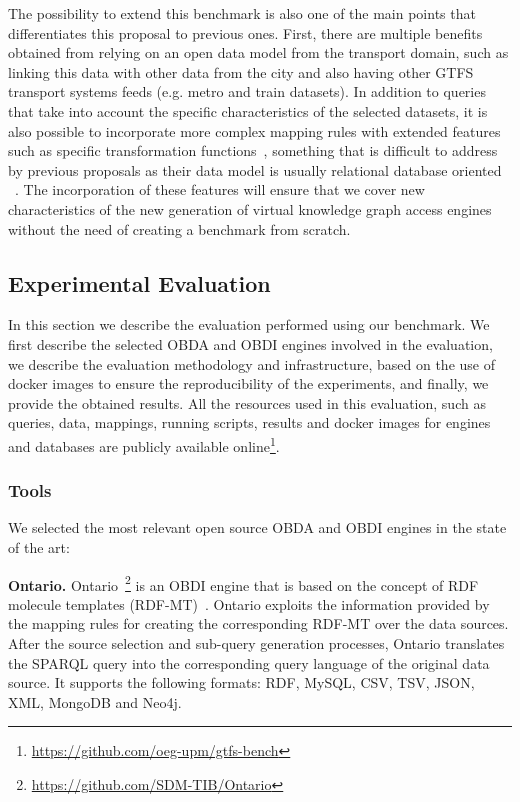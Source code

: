 The possibility to extend this benchmark is also one of the main points that differentiates this proposal to previous ones. First, there are multiple benefits obtained from relying on an open data model from the transport domain, such as linking this data with other data from the city and also having other GTFS transport systems feeds (e.g. metro and train datasets). In addition to queries that take into account the specific characteristics of the selected datasets, it is also possible to incorporate more complex mapping rules with extended features such as specific transformation functions~\citep{de2016ontology}, something that is difficult to address by previous proposals as their data model is usually relational database oriented ~\citep{bizer2009berlin,lanti2015npd}. The incorporation of these features will ensure that we cover new characteristics of the new generation of virtual knowledge graph access engines without the need of creating a benchmark from scratch.  


\subsection{Experimental Evaluation}
In this section we describe the evaluation performed using our benchmark. We first describe the selected OBDA and OBDI engines involved in the evaluation, we describe the evaluation methodology and infrastructure, based on the use of docker images to ensure the reproducibility of the experiments, and finally, we provide the obtained results. All the resources used in this evaluation, such as queries, data, mappings, running scripts, results and docker images for engines and databases are publicly available online\footnote{\url{https://github.com/oeg-upm/gtfs-bench}}.

\subsubsection{Tools}

We selected the most relevant open source OBDA and OBDI engines in the state of the art: 

\noindent\textbf{Ontario.} Ontario~\citep{endris2019ontario}\footnote{\url{https://github.com/SDM-TIB/Ontario}} is an OBDI engine that is based on the concept of RDF molecule templates (RDF-MT)~\citep{endris2017mulder}. Ontario exploits the information provided by the mapping rules for creating the corresponding RDF-MT over the data sources. After the source selection and sub-query generation processes, Ontario translates the SPARQL query into the corresponding query language of the original data source. It supports the following formats: RDF, MySQL, CSV, TSV, JSON, XML, MongoDB and Neo4j.

